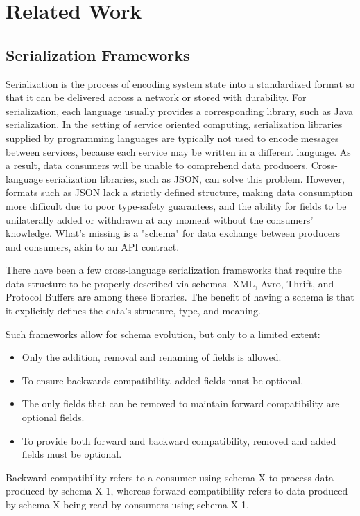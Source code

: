 
%

\chapter{Related Work}
\label{cha:related_work}

\section{Serialization Frameworks} %
\label{sec:serialization_frameworks}

Serialization is the process of encoding system state into a standardized format so that it can be delivered across a network or stored with durability.
For serialization, each language usually provides a corresponding library, such as Java serialization.
In the setting of service oriented computing, serialization libraries supplied by programming languages are typically not used to encode messages between services,
because each service may be written in a different language. As a result, data consumers will be unable to comprehend data producers.
Cross-language serialization libraries, such as JSON, can solve this problem.
However, formats such as JSON lack a strictly defined structure,
making data consumption more difficult due to poor type-safety guarantees, and the ability for fields to be unilaterally added or withdrawn at any moment without the consumers' knowledge.
What's missing is a "schema" for data exchange between producers and consumers, akin to an API contract.

There have been a few cross-language serialization frameworks that require the data structure to be properly described via schemas.
XML, Avro, Thrift, and Protocol Buffers are among these libraries.
The benefit of having a schema is that it explicitly defines the data's structure, type, and meaning.

Such frameworks allow for schema evolution, but only to a limited extent:
\begin{itemize}
    \item Only the addition, removal and renaming of fields is allowed.
    \item To ensure backwards compatibility, added fields must be optional.
    \item The only fields that can be removed to maintain forward compatibility are optional fields.
    \item To provide both forward and backward compatibility, removed and added fields must be optional.
\end{itemize}
Backward compatibility refers to a consumer using schema X to process data produced by schema X-1,
whereas forward compatibility refers to data produced by schema X being read by consumers using schema X-1.

